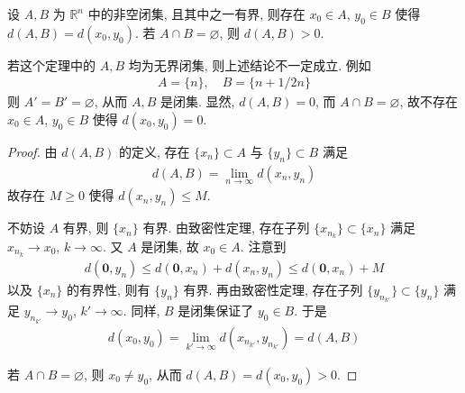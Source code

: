 \documentclass[../../main.tex]{subfiles}
\begin{document}
\begin{theorem}
设 $A, B$ 为 $\mathbb{R}^n$ 中的非空闭集, 且其中之一有界, 则存在 $x_0 \in A$, $y_0 \in B$ 使得 $d(A, B) = d(x_0, y_0)$. 若 $A \cap B = \varnothing$, 则 $d(A, B) > 0$.
\end{theorem}
\begin{remark}
若这个定理中的 $A, B$ 均为无界闭集, 则上述结论不一定成立. 例如
\begin{align*}
A = \{n\}, \quad B = \{n + 1/2n\}
\end{align*}
则 $A' = B' = \varnothing$, 从而 $A, B$ 是闭集. 显然, $d(A, B) = 0$, 而 $A \cap B = \varnothing$, 故不存在 $x_0 \in A$, $y_0 \in B$ 使得 $d(x_0, y_0) = 0$.
\end{remark}
\begin{proof}
由 $d(A, B)$ 的定义, 存在 $\{x_n\} \subset A$ 与 $\{y_n\} \subset B$ 满足
\begin{align*}
d(A, B) = \lim_{n \to \infty} d(x_n, y_n)
\end{align*}
故存在 $M \geqslant 0$ 使得 $d(x_n, y_n) \leqslant M$.

不妨设 $A$ 有界, 则 $\{x_n\}$ 有界. 由致密性定理, 存在子列 $\{x_{n_k}\} \subset \{x_n\}$ 满足 $x_{n_k} \to x_0$, $k \to \infty$. 又 $A$ 是闭集, 故 $x_0 \in A$. 注意到
\begin{align*}
d(\mathbf{0}, y_n) \leqslant d(\mathbf{0}, x_n) + d(x_n, y_n) \leqslant d(\mathbf{0}, x_n) + M
\end{align*}
以及 $\{x_n\}$ 的有界性, 则有 $\{y_n\}$ 有界. 再由致密性定理, 存在子列 $\{y_{n_{k'}}\} \subset \{y_n\}$ 满足 $y_{n_{k'}} \to y_0$, $k' \to \infty$. 同样, $B$ 是闭集保证了 $y_0 \in B$. 于是
\begin{align*}
d(x_0, y_0) = \lim_{k' \to \infty} d(x_{n_{k'}}, y_{n_{k'}}) = d(A, B)
\end{align*}

若 $A \cap B = \varnothing$, 则 $x_0 \neq y_0$, 从而 $d(A, B) = d(x_0, y_0) > 0$.
\end{proof}
\end{document}
